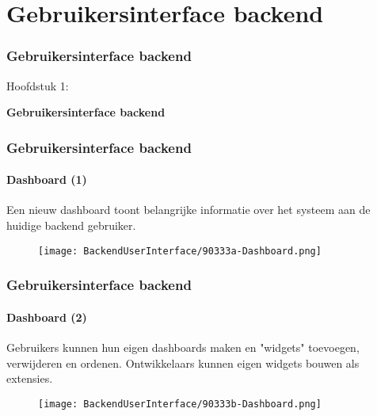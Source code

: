 %

\section{Gebruikersinterface backend}
\begin{frame}[fragile]
	\frametitle{Gebruikersinterface backend}

	\begin{center}\huge{Hoofdstuk 1:}\end{center}
	\begin{center}\huge{\color{typo3darkgrey}\textbf{Gebruikersinterface backend}}\end{center}

\end{frame}


\begin{frame}[fragile]
	\frametitle{Gebruikersinterface backend}
	\framesubtitle{Dashboard (1)}

	Een nieuw dashboard toont belangrijke informatie over het systeem aan de huidige backend gebruiker.

	\begin{figure}
		\texttt{[image: BackendUserInterface/90333a-Dashboard.png]}
	\end{figure}

\end{frame}


\begin{frame}[fragile]
	\frametitle{Gebruikersinterface backend}
	\framesubtitle{Dashboard (2)}

	Gebruikers kunnen hun eigen dashboards maken en "widgets" toevoegen, verwijderen en
	ordenen. Ontwikkelaars kunnen eigen widgets bouwen als extensies.

	\begin{figure}
		\texttt{[image: BackendUserInterface/90333b-Dashboard.png]}
	\end{figure}

\end{frame}

